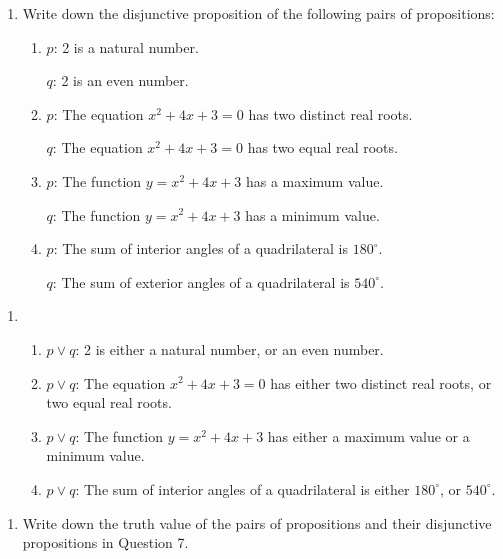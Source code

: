 \documentclass{report}
\begin{document}
\vspace{0.5cm}
\begin{enumerate}[label=\textbf{Example \arabic*}, leftmargin=*, start=7]
    \item Write down the disjunctive proposition of the following pairs of propositions:
          \begin{enumerate}[label=(\alph*), leftmargin=*]
              \item $p$: 2 is a natural number.

                    $q$: 2 is an even number.

              \item $p$: The equation $x^2 + 4x + 3 = 0$ has two distinct real roots.

                    $q$: The equation $x^2 + 4x + 3 = 0$ has two equal real roots.

              \item $p$: The function $y = x^2 + 4x + 3$ has a maximum value.

                    $q$: The function $y = x^2 + 4x + 3$ has a minimum value.

              \item $p$: The sum of interior angles of a quadrilateral is $180^\circ$.

                    $q$: The sum of exterior angles of a quadrilateral is $540^\circ$.
          \end{enumerate}
\end{enumerate}
\begin{enumerate}[label=\textbf{Sol.}, leftmargin=*]
    \item \begin{enumerate}[label=, leftmargin=*]
              \item $p \lor q$: 2 is either a natural number, or an even number.
              \item $p \lor q$: The equation $x^2 + 4x + 3 = 0$ has either two distinct real roots, or two equal real roots.
              \item $p \lor q$: The function $y = x^2 + 4x + 3$ has either a maximum value or a minimum value.
              \item $p \lor q$: The sum of interior angles of a quadrilateral is either $180^\circ$, or $540^\circ$.
          \end{enumerate}
\end{enumerate}
\vspace{0.1cm}
\begin{enumerate}[label=\textbf{Example \arabic*}, leftmargin=*, start=8]
    \item Write down the truth value of the pairs of propositions and their disjunctive
          propositions in Question 7.
\end{enumerate}
\end{document}
